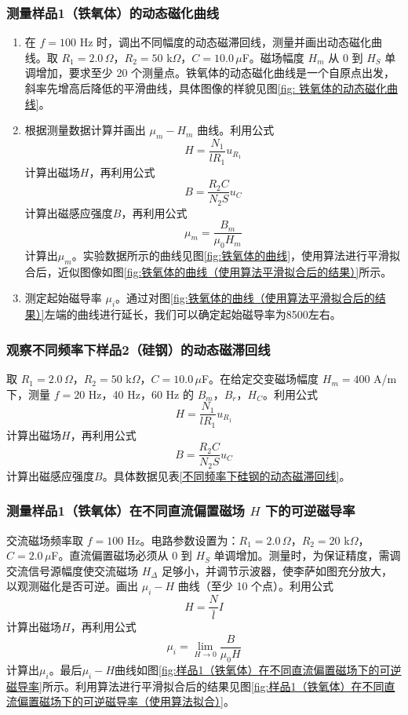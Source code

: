 \documentclass[zihao=5, UTF8]{article}
\theoremstyle{MyLineTheoremStyle} %
\theoremstyle{MyBlockTheoremStyle} %
\theoremstyle{MySubsubsectionStyle} %
\begin{document}
\subsubsection{测量样品1（铁氧体）的动态磁化曲线}
\begin{enumerate}
  \item 在 $f = 100$ Hz 时，调出不同幅度的动态磁滞回线，测量并画出动态磁化曲线。取 $R_1 = 2.0 \, \Omega$，$R_2 = 50$ k$\Omega$，$C = 10.0 \, \mu$F。磁场幅度 $H_m$ 从 0 到 $H_S$ 单调增加，要求至少 20 个测量点。铁氧体的动态磁化曲线是一个自原点出发，斜率先增高后降低的平滑曲线，具体图像的样貌见图\ref{fig: 铁氧体的动态磁化曲线}。
  \item 根据测量数据计算并画出 $\mu_m - H_m$ 曲线。利用公式$$H=\frac{N_1}{lR_1}u_{R_1}$$计算出磁场$H$，再利用公式$$B=\frac{R_2C}{N_2S}u_C$$计算出磁感应强度$B$，再利用公式$$\mu_m=\frac{B_m}{\mu_0H_m}$$计算出$\mu_m$。实验数据所示的曲线见图\ref{fig:铁氧体的曲线}，使用算法进行平滑拟合后，近似图像如图\ref{fig:铁氧体的曲线（使用算法平滑拟合后的结果）}所示。
    \item 测定起始磁导率 $\mu_i$。通过对图\ref{fig:铁氧体的曲线（使用算法平滑拟合后的结果）}左端的曲线进行延长，我们可以确定起始磁导率为8500左右。
\end{enumerate}
\subsubsection{观察不同频率下样品2（硅钢）的动态磁滞回线}
取 $R_1 = 2.0 \, \Omega$，$R_2 = 50$ k$\Omega$，$C = 10.0 \, \mu$F。在给定交变磁场幅度 $H_m = 400$ A/m 下，测量 $f = 20$ Hz，40 Hz，60 Hz 的 $B_m$，$B_r$，$H_C$。利用公式$$H=\frac{N_1}{lR_1}u_{R_1}$$计算出磁场$H$，再利用公式$$B=\frac{R_2C}{N_2S}u_C$$计算出磁感应强度$B$。具体数据见表\ref{不同频率下硅钢的动态磁滞回线}。

\subsubsection{测量样品1（铁氧体）在不同直流偏置磁场 $H$ 下的可逆磁导率}
交流磁场频率取 $f = 100$ Hz。电路参数设置为：$R_1 = 2.0 \, \Omega$，$R_2 = 20$ k$\Omega$，$C = 2.0 \, \mu$F。直流偏置磁场必须从 0 到 $H_S$ 单调增加。测量时，为保证精度，需调交流信号源幅度使交流磁场 $H_\Delta$ 足够小，并调节示波器，使李萨如图充分放大，以观测磁化是否可逆。画出 $\mu_i - H$ 曲线（至少 10 个点）。利用公式$$H=\frac{N}{\bar l}I$$计算出磁场$H$，再利用公式$$\mu_i=\lim_{H \to 0}\frac{B}{\mu_0H}$$计算出$\mu_i$。最后$\mu_i - H$曲线如图\ref{fig:样品1（铁氧体）在不同直流偏置磁场下的可逆磁导率}所示。利用算法进行平滑拟合后的结果见图\ref{fig:样品1（铁氧体）在不同直流偏置磁场下的可逆磁导率（使用算法拟合）}。
\end{document}
